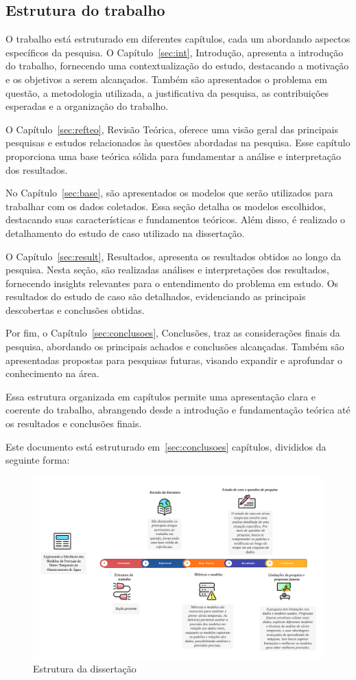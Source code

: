 \subsection{Estrutura do trabalho} \label{subsec:estrutura}



O trabalho está estruturado em diferentes capítulos, cada um abordando aspectos específicos da pesquisa. 
O Capítulo~\ref{sec:int}, Introdução, apresenta a introdução do trabalho, fornecendo uma contextualização do estudo, destacando a motivação e os objetivos a serem alcançados. Também são apresentados o problema em questão, a metodologia utilizada, a justificativa da pesquisa, as contribuições esperadas e a organização do trabalho.

O Capítulo~\ref{sec:refteo}, Revisão Teórica, oferece uma visão geral das principais pesquisas e estudos relacionados às questões abordadas na pesquisa. Esse capítulo proporciona uma base teórica sólida para fundamentar a análise e interpretação dos resultados.

No Capítulo~\ref{sec:base}, são apresentados os modelos que serão utilizados para trabalhar com os dados coletados. Essa seção detalha os modelos escolhidos, destacando suas características e fundamentos teóricos. Além disso, é realizado o detalhamento do estudo de caso utilizado na dissertação.

O Capítulo~\ref{sec:result}, Resultados, apresenta os resultados obtidos ao longo da pesquisa. Nesta seção, são realizadas análises e interpretações dos resultados, fornecendo insights relevantes para o entendimento do problema em estudo. Os resultados do estudo de caso são detalhados, evidenciando as principais descobertas e conclusões obtidas.

Por fim, o Capítulo~\ref{sec:conclusoes}, Conclusões, traz as considerações finais da pesquisa, abordando os principais achados e conclusões alcançadas. Também são apresentadas propostas para pesquisas futuras, visando expandir e aprofundar o conhecimento na área.

Essa estrutura organizada em capítulos permite uma apresentação clara e coerente do trabalho, abrangendo desde a introdução e fundamentação teórica até os resultados e conclusões finais.

 Este documento está estruturado em~\ref{sec:conclusoes} capítulos, divididos da seguinte forma:

\begin{figure}[htpb!]
	\centering
	\caption{Estrutura da dissertação}
	\label{fig:estrutura}
	\includegraphics[width=1\linewidth]{Introducao/Figuras/Estrutura}
	
\end{figure}

